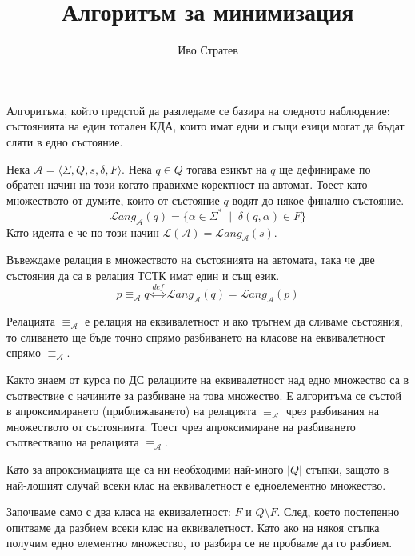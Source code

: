 \documentclass[12pt]{article}
\title{Алгоритъм за минимизация}
\author{Иво Стратев}
\begin{document}
\maketitle

Алгоритъма, който предстой да разгледаме се базира на следното наблюдение:
състоянията на един тотален КДА, които имат едни и същи езици могат да бъдат сляти в едно състояние.

\vspace*{3mm}

\par Нека \(\mathcal{A} = \langle \Sigma, Q, s, \delta, F \rangle\). Нека \(q \in Q\) тогава езикът на \(q\) ще дефинираме по обратен начин на този когато правихме коректност на автомат. Тоест като множеството от думите, които от състояние \(q\) водят до някое финално състояние.
\[\mathcal{L}ang_\mathcal{A}(q) = \{\alpha \in \Sigma^* \;\mid\; \delta(q, \alpha) \in F\}\]
Като идеята е че по този начин \(\mathcal{L}(\mathcal{A}) = \mathcal{L}ang_\mathcal{A}(s)\).

\vspace*{3mm}

\par Въвеждаме релация в множеството на състоянията на автомата, така че две състояния да са в релация ТСТК имат един и същ език.
\[p \equiv_{\mathcal{A}} q \overset{def}{\iff} \mathcal{L}ang_\mathcal{A}(q) = \mathcal{L}ang_\mathcal{A}(p)\]

Релацията \(\equiv_{\mathcal{A}}\) е релация на еквивалетност и ако тръгнем да сливаме състояния, то сливането ще бъде точно спрямо разбиването на класове на еквивалетност спрямо \(\equiv_{\mathcal{A}}\).

\vspace*{3mm}

\par Както знаем от курса по ДС релациите на еквивалетност  над едно множество са в съотвествие с начините за разбиване на това множество. Е алгоритъма се състой в апроксимирането (приближаването) на релацията \(\equiv_{\mathcal{A}}\) чрез разбивания на множеството от състоянията. Тоест чрез апроксимиране на разбиването съотвестващо на релацията \(\equiv_{\mathcal{A}}\).

Като за апроксимацията ще са ни необходими най-много \(|Q|\) стъпки, защото в най-лошият случай всеки клас на еквивалетност е едноелементно множество.

\vspace*{3mm}

\par Започваме само с два класа на еквивалетност: \(F\) и \(Q \setminus F\).
След, което постепенно опитваме да разбием всеки клас на еквивалетност.
Като ако на някоя стъпка получим едно елементно множество, то разбира се не пробваме да го разбием.
\end{document}
